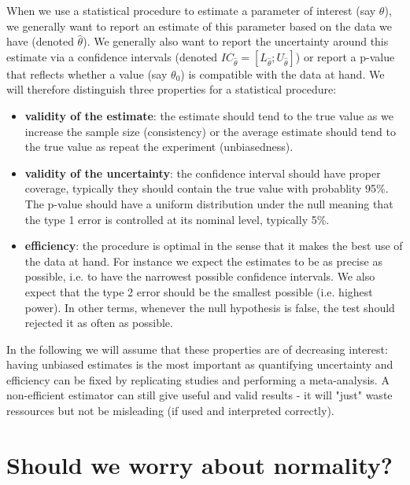 \documentclass[12pt]{article}
\begin{document}
When we use a statistical procedure to estimate a parameter of
interest (say \(\theta\)), we generally want to report an estimate of
this parameter based on the data we have (denoted
\(\widehat{\theta}\)). We generally also want to report the
uncertainty around this estimate via a confidence intervals (denoted
\(IC_{\widehat{\theta}} = [L_{\widehat{\theta}} ;
U_{\widehat{\theta}}]\)) or report a p-value that reflects whether a
value (say \(\theta_0\)) is compatible with the data at hand. We will
therefore distinguish three properties for a statistical procedure:
\begin{itemize}
\item \textbf{validity of the estimate}: the estimate should tend to the true
value as we increase the sample size (consistency) or the average
estimate should tend to the true value as repeat the
experiment (unbiasedness).
\item \textbf{validity of the uncertainty}: the confidence interval should have
proper coverage, typically they should contain the true value with
probablity 95\%. The p-value should have a uniform distribution under
the null meaning that the type 1 error is controlled at its nominal
level, typically 5\%.
\item \textbf{efficiency}: the procedure is optimal in the sense that it makes
the best use of the data at hand. \newline For instance we expect
the estimates to be as precise as possible, i.e. to have the
narrowest possible confidence intervals. We also expect that the
type 2 error should be the smallest possible (i.e. highest
power). In other terms, whenever the null hypothesis is false, the
test should rejected it as often as possible.
\end{itemize}

\bigskip

In the following we will assume that these properties are of
decreasing interest: having unbiased estimates is the most important
as quantifying uncertainty and efficiency can be fixed by
replicating studies and performing a meta-analysis. A non-efficient
estimator can still give useful and valid results - it will "just"
waste ressources but not be misleading (if used and interpreted
correctly).

\clearpage

\section{Should we worry about normality?}
\label{sec:org608019c}
\end{document}
